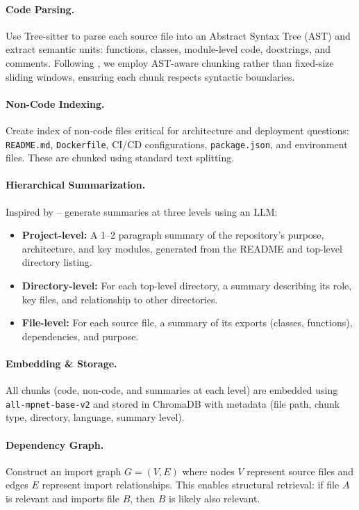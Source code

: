 \documentclass[11pt]{article}
\begin{document}
\paragraph{Code Parsing.}  Use Tree-sitter to parse each source file into an Abstract Syntax Tree (AST) and extract semantic units: functions, classes, module-level code, docstrings, and comments. Following \citet{cast2025}, we employ AST-aware chunking rather than fixed-size sliding windows, ensuring each chunk respects syntactic boundaries.

\paragraph{Non-Code Indexing.}  Create index of non-code files critical for architecture and deployment questions: \texttt{README.md}, \texttt{Dockerfile}, CI/CD configurations, \texttt{package.json}, and environment files. These are chunked using standard text splitting.

\paragraph{Hierarchical Summarization.} Inspired by \citet{tufek2025hierarchical} -- generate summaries at three levels using an LLM:
\begin{itemize}
    \item \textbf{Project-level:} A 1--2 paragraph summary of the repository's purpose, architecture, and key modules, generated from the README and top-level directory listing.
    \item \textbf{Directory-level:} For each top-level directory, a summary describing its role, key files, and relationship to other directories.
    \item \textbf{File-level:} For each source file, a summary of its exports (classes, functions), dependencies, and purpose.
\end{itemize}

\paragraph{Embedding \& Storage.} All chunks (code, non-code, and summaries at each level) are embedded using \texttt{all-mpnet-base-v2} and stored in ChromaDB with metadata (file path, chunk type, directory, language, summary level).

\paragraph{Dependency Graph.} Construct an import graph $G = (V, E)$ where nodes $V$ represent source files and edges $E$ represent import relationships. This enables structural retrieval: if file $A$ is relevant and imports file $B$, then $B$ is likely also relevant.
\end{document}
